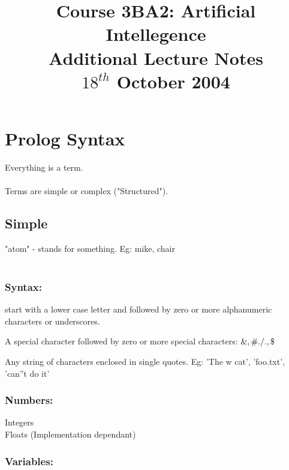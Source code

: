 \documentclass[a4paper,12pt]{article}
\begin{document}
\title{Course 3BA2: Artificial Intellegence \\ Additional Lecture Notes \\ $18^{th}$ October 2004}

\maketitle

\section*{Prolog Syntax}

Everything is a term. \\

\\

Terms are simple or complex ("Structured").

\subsection*{Simple}

"atom" - stands for something. Eg: mike, chair \\

\\

\subsubsection*{Syntax:} 

start with a lower case letter and followed by zero or more 
alphanumeric characters or underscores.


A special character followed by zero or more special characters: $ \&, \#. /. \*, \$ $


Any string of characters enclosed in single quotes. Eg: 'The w cat', 'foo.txt', 'can''t do it'

\subsubsection*{Numbers:}

Integers \\

Floats (Implementation dependant)

\subsubsection{Variables:}
\end{document}
